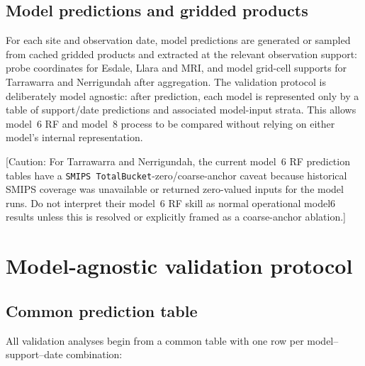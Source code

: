 \documentclass[11pt,a4paper]{article}
\newcommand{\modelSix}{model~6 RF}
\newcommand{\modelEight}{model~8 process}
\newcommand{\smips}{\texttt{SMIPS TotalBucket}}
\newcommand{\caution}[1]{\textcolor{cautioncolor}{[Caution: #1]}}
\begin{document}
\subsection{Model predictions and gridded products}\label{sec:model-products}

For each site and observation date, model predictions are generated or sampled
from cached gridded products and extracted at the relevant observation support:
probe coordinates for Esdale, Llara and MRI, and model grid-cell supports for
Tarrawarra and Nerrigundah after aggregation.
The validation protocol is deliberately model agnostic: after prediction,
each model is represented only by a table of support/date predictions and
associated model-input strata.  This allows \modelSix{} and \modelEight{} to be
compared without relying on either model's internal representation.

\caution{For Tarrawarra and Nerrigundah, the current \modelSix{} prediction
tables have a \smips{}-zero/coarse-anchor caveat because historical SMIPS
coverage was unavailable or returned zero-valued inputs for the model runs.
Do not interpret their \modelSix{} skill as normal operational model6 results
unless this is resolved or explicitly framed as a coarse-anchor ablation.}

\section{Model-agnostic validation protocol}\label{sec:protocol}

\subsection{Common prediction table}\label{sec:table-schema}

All validation analyses begin from a common table with one row per
model--support--date combination:
\end{document}
